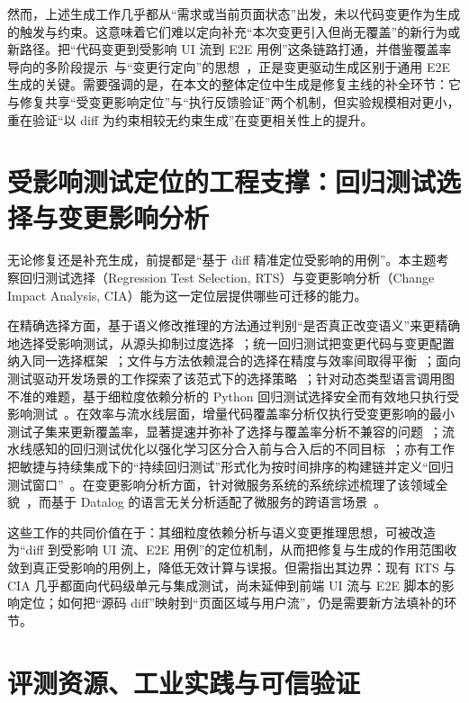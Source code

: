 \documentclass[11pt,a4paper]{article}
\begin{document}
然而，上述生成工作几乎都从“需求或当前页面状态”出发，未以代码变更作为生成的触发与约束。这意味着它们难以定向补充“本次变更引入但尚无覆盖”的新行为或新路径。把“代码变更到受影响 UI 流到 E2E 用例”这条链路打通，并借鉴覆盖率导向的多阶段提示~\cite{symprompt}与“变更行定向”的思想~\cite{chaco}，正是变更驱动生成区别于通用 E2E 生成的关键。需要强调的是，在本文的整体定位中生成是修复主线的补全环节：它与修复共享“受变更影响定位”与“执行反馈验证”两个机制，但实验规模相对更小，重在验证“以 diff 为约束相较无约束生成”在变更相关性上的提升。

\section{受影响测试定位的工程支撑：回归测试选择与变更影响分析}

无论修复还是补充生成，前提都是“基于 diff 精准定位受影响的用例”。本主题考察回归测试选择（Regression Test Selection, RTS）与变更影响分析（Change Impact Analysis, CIA）能为这一定位层提供哪些可迁移的能力。

在精确选择方面，基于语义修改推理的方法通过判别“是否真正改变语义”来更精确地选择受影响测试，从源头抑制过度选择~\cite{preciserts}；统一回归测试把变更代码与变更配置纳入同一选择框架~\cite{urts}；文件与方法依赖混合的选择在精度与效率间取得平衡~\cite{hybridrts}；面向测试驱动开发场景的工作探索了该范式下的选择策略~\cite{richtest}；针对动态类型语言调用图不准的难题，基于细粒度依赖分析的 Python 回归测试选择安全而有效地只执行受影响测试~\cite{namerts}。在效率与流水线层面，增量代码覆盖率分析仅执行受变更影响的最小测试子集来更新覆盖率，显著提速并弥补了选择与覆盖率分析不兼容的问题~\cite{ijacoco}；流水线感知的回归测试优化以强化学习区分合入前与合入后的不同目标~\cite{pipelinerts}；亦有工作把敏捷与持续集成下的“持续回归测试”形式化为按时间排序的构建链并定义“回归测试窗口”~\cite{formalizingrts}。在变更影响分析方面，针对微服务系统的系统综述梳理了该领域全貌~\cite{ciaslr}，而基于 Datalog 的语言无关分析适配了微服务的跨语言场景~\cite{microscope}。

这些工作的共同价值在于：其细粒度依赖分析与语义变更推理思想，可被改造为“diff 到受影响 UI 流、E2E 用例”的定位机制，从而把修复与生成的作用范围收敛到真正受影响的用例上，降低无效计算与误报。但需指出其边界：现有 RTS 与 CIA 几乎都面向代码级单元与集成测试，尚未延伸到前端 UI 流与 E2E 脚本的影响定位；如何把“源码 diff”映射到“页面区域与用户流”，仍是需要新方法填补的环节。

\section{评测资源、工业实践与可信验证}
\end{document}
